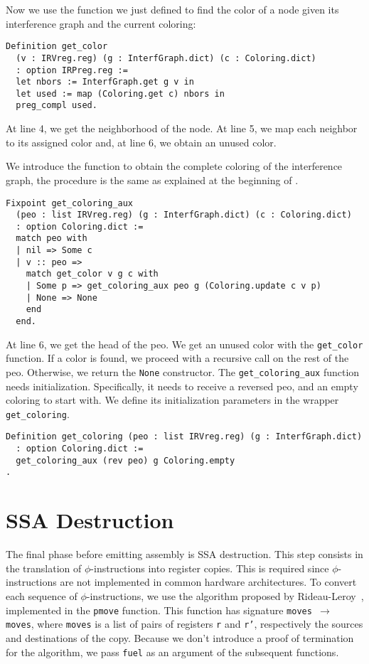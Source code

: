 Now we use the function we just defined to find the color of a node given its interference graph and the current coloring:

\begin{lstlisting}[style=Rocq]
Definition get_color
  (v : IRVreg.reg) (g : InterfGraph.dict) (c : Coloring.dict)
  : option IRPreg.reg :=
  let nbors := InterfGraph.get g v in
  let used := map (Coloring.get c) nbors in
  preg_compl used.
\end{lstlisting}

At line 4, we get the neighborhood of the node. At line 5, we map each neighbor to its assigned color and, at line 6, we obtain an unused color.

We introduce the function to obtain the complete coloring of the interference graph, the procedure is the same as explained at the beginning of .

\begin{lstlisting}[style=Rocq]
Fixpoint get_coloring_aux
  (peo : list IRVreg.reg) (g : InterfGraph.dict) (c : Coloring.dict)
  : option Coloring.dict :=
  match peo with
  | nil => Some c
  | v :: peo =>
    match get_color v g c with
    | Some p => get_coloring_aux peo g (Coloring.update c v p)
    | None => None
    end
  end.
\end{lstlisting}

At line 6, we get the head of the \gls{peo}. We get an unused color with the \texttt{get\_color} function. If a color is found, we proceed with a recursive call on the rest of the \gls{peo}. Otherwise, we return the \texttt{None} constructor.
The \texttt{get\_coloring\_aux} function needs initialization. Specifically, it needs to receive a reversed \gls{peo}, and an empty coloring to start with. We define its initialization parameters in the wrapper \texttt{get\_coloring}.

\begin{lstlisting}[style=Rocq]
Definition get_coloring (peo : list IRVreg.reg) (g : InterfGraph.dict)
  : option Coloring.dict :=
  get_coloring_aux (rev peo) g Coloring.empty
.
\end{lstlisting}

\section{SSA Destruction}
\label{sec:destruct}

The final phase before emitting assembly is SSA destruction. This step consists in the translation of $\phi$-instructions into register copies. This is required since $\phi$-instructions are not implemented in common hardware architectures.
To convert each sequence of $\phi$-instructions, we use the algorithm proposed by Rideau-Leroy~\cite{Rideau-Leroy-regalloc}, implemented in the \texttt{pmove} function. This function has signature \texttt{moves $\to$ moves}, where \texttt{moves} is a list of pairs of registers \texttt r and \texttt{r'}, respectively the sources and destinations of the copy.
Because we don't introduce a proof of termination for the algorithm, we pass \texttt{fuel} as an argument of the subsequent functions.

